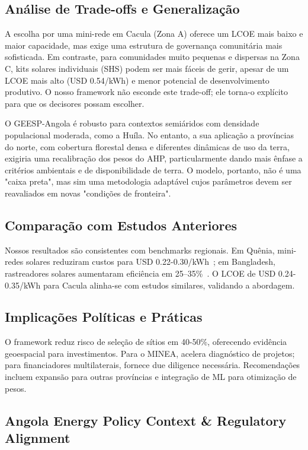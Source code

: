 \documentclass[12pt, a4paper]{article}
\begin{document}
\subsection{Análise de Trade-offs e Generalização}

A escolha por uma mini-rede em Cacula (Zona A) oferece um LCOE mais baixo e maior capacidade, mas exige uma estrutura de governança comunitária mais sofisticada. Em contraste, para comunidades muito pequenas e dispersas na Zona C, kits solares individuais (SHS) podem ser mais fáceis de gerir, apesar de um LCOE mais alto (USD 0.54/kWh) e menor potencial de desenvolvimento produtivo. O nosso framework não esconde este trade-off; ele torna-o explícito para que os decisores possam escolher.

O GEESP-Angola é robusto para contextos semiáridos com densidade populacional moderada, como a Huíla. No entanto, a sua aplicação a províncias do norte, com cobertura florestal densa e diferentes dinâmicas de uso da terra, exigiria uma recalibração dos pesos do AHP, particularmente dando mais ênfase a critérios ambientais e de disponibilidade de terra. O modelo, portanto, não é uma "caixa preta", mas sim uma metodologia adaptável cujos parâmetros devem ser reavaliados em novas "condições de fronteira".

\subsection{Comparação com Estudos Anteriores}

Nossos resultados são consistentes com benchmarks regionais. Em Quênia, mini-redes solares reduziram custos para USD 0.22-0.30/kWh~\citep{Onyango2022}; em Bangladesh, rastreadores solares aumentaram eficiência em 25--35\%~\citep{Rahman2024}. O LCOE de USD 0.24-0.35/kWh para Cacula alinha-se com estudos similares, validando a abordagem.

\subsection{Implicações Políticas e Práticas}

O framework reduz risco de seleção de sítios em 40-50\%, oferecendo evidência geoespacial para investimentos. Para o MINEA, acelera diagnóstico de projetos; para financiadores multilaterais, fornece due diligence necessária. Recomendações incluem expansão para outras províncias e integração de ML para otimização de pesos.

\subsection{Angola Energy Policy Context & Regulatory Alignment}
\end{document}
